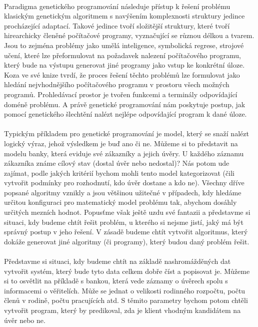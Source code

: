 \documentclass[bc,male,java,dept460]{diploma}		%
\begin{document}
\paragraph*{}
Paradigma genetického programování následuje přístup k řešení problému klasickým genetickým algoritmem s navýšením komplexnosti struktury jedince procházející adaptací. Takové jedince tvoří složitější struktury, které tvoří hirearchicky členěné počítačové programy, vyznačující se různou délkou a tvarem. Jsou to zejména problémy jako umělá inteligence, symbolická regrese, strojové učení, které lze přeformulovat na požadavek nalezení počítačového programu, který bude na výstupu generovat jiné programy jako vstup ke konkrétní úloze. Koza ve své knize tvrdí, že proces řešení těchto problémů lze formulovat jako hledání nejvhodnějšího počítačového programu v prostoru všech možných programů. Prohledávací prostor je tvořen funkcemi a terminály odpovídající doméně problému. A právě genetické programování nám poskytuje postup, jak pomocí genetického šlechtění nalézt nejlépe odpovídající program k dané úloze.
\paragraph*{}
Typickým příkladem pro genetické programování je model, který se snaží nalézt logický výraz, jehož výsledkem je buď ano či ne. Můžeme si to představit na modelu banky, která eviduje své zákazníky a jejich úvěry. U každého záznamu zákazníka známe cílový stav (dostal úvěr nebo nedostal)? Nás potom ude zajímat, podle jakých kritérií bychom mohli tento model kategorizovat (čili vytvořit podmínky pro rozhodnutí, kdo úvěr dostane a kdo ne).
Všechny dříve popsané algoritmy vznikly a jsou většinou užitečné v případech, kdy hledáme určitou konfiguraci pro matematický model problému tak, abychom dosáhly určitých mezních hodnot. Popusťme však ještě uzdu své fantazii a představme si situaci, kdy budeme chtít řešit problém, u kterého si nejsme jistí, jaký má být správný postup v jeho řešení. V zásadě budeme chtít vytvořit algoritmus, který dokáže generovat jiné algoritmy (či programy), který budou daný problém řešit.
\paragraph*{}
Představme si situaci, kdy budeme chtít na základě nashromážděných dat vytvořit systém, který bude tyto data celkem dobře číst a popisovat je. Můžeme si to osvětlit na příkladě s bankou, která vede záznamy o úvěrech spolu s informacemi o věřitelích. Může se jednat o velikosti rodinného rozpočtu, počtu členů v rodině, počtu pracujících atd. S těmito parametry bychom potom chtěli vytvořit program, který by predikoval, zda je klient vhodným kandidátem na úvěr nebo ne.
\end{document}

